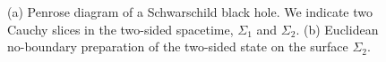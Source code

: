 \documentclass[11pt]{article}
\numberwithin{equation}{section}
\begin{document}
 
\begin{figure}[h!]
\begin{center}
  \hspace{1cm} 
 \caption{\label{fig:appendix1} (a) Penrose diagram of a Schwarschild black hole. We indicate two Cauchy slices in the two-sided spacetime, $\Sigma_1$ and $\Sigma_2$. (b) Euclidean no-boundary preparation of the two-sided state on the surface $\Sigma_2$. }
\end{center}
\end{figure}
\end{document}
